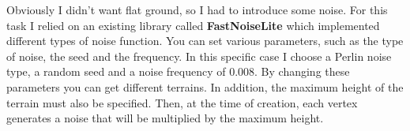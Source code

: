 \begin{figure}[hbt!]
	\centering
	\qquad
	\caption{}
\end{figure}

\noindent
Obviously I didn't want flat ground, so I had to introduce some noise. For this task I relied on an existing library called \textbf{FastNoiseLite} which implemented different types of noise function. You can set various parameters, such as the type of noise, the seed and the frequency. In this specific case I choose a Perlin noise type, a random seed and a noise frequency of 0.008. By changing these parameters you can get different terrains.
In addition, the maximum height of the terrain must also be specified. Then, at the time of creation, each vertex generates a noise that will be multiplied by the maximum height.

\newpage
\begin{figure}[hbt!]
	\centering
	\qquad
	\caption{}
\end{figure}

